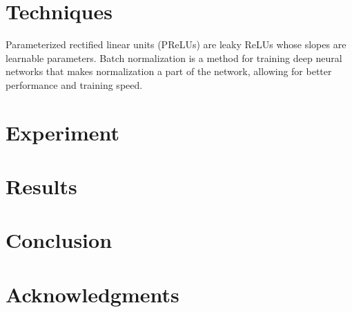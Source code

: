 \documentclass{article} %
\begin{document}
\section{Techniques} \label{section:techniques}
Parameterized rectified linear units (PReLUs) \cite{DBLP:journals/corr/HeZR015} are leaky ReLUs whose slopes are learnable parameters.
Batch normalization \cite{DBLP:journals/corr/IoffeS15} is a method for training deep neural networks that makes normalization a part of the network, allowing for better performance and training speed.

\section{Experiment} \label{section:experiment}

\section{Results} \label{section:results}

\section{Conclusion} \label{section:conclusion}

\section*{Acknowledgments}


\printbibliography
\end{document}

